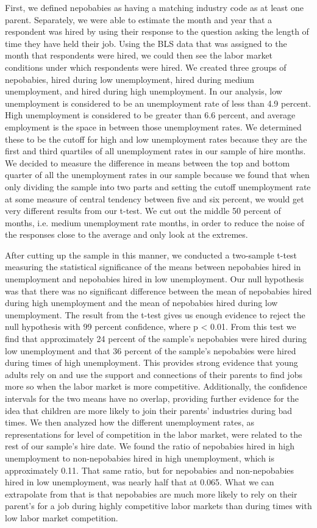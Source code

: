 \documentclass[12pt]{article}
\begin{document}
First, we defined nepobabies as having a matching industry code as at least one parent. Separately, we were able to estimate the month and year that a respondent was hired by using their response to the question asking the length of time they have held their job. Using the BLS data that was assigned to the month that respondents were hired, we could then see the labor market conditions under which respondents were hired. We created three groups of nepobabies, hired during low unemployment, hired during medium unemployment, and hired during high unemployment. In our analysis, low unemployment is considered to be an unemployment rate of less than 4.9 percent. High unemployment is considered to be greater than 6.6 percent, and average employment is the space in between those unemployment rates. We determined these to be the cutoff for high and low unemployment rates because they are the first and third quartiles of all unemployment rates in our sample of hire months. We decided to measure the difference in means between the top and bottom quarter of all the unemployment rates in our sample because we found that when only dividing the sample into two parts and setting the cutoff unemployment rate at some measure of central tendency between five and six percent, we would get very different results from our t-test. We cut out the middle 50 percent of months, i.e. medium unemployment rate months, in order to reduce the noise of the responses close to the average and only look at the extremes.


After cutting up the sample in this manner, we conducted a two-sample t-test measuring the statistical significance of the means between nepobabies hired in unemployment and nepobabies hired in low unemployment. Our null hypothesis was that there was no significant difference between the mean of nepobabies hired during high unemployment and the mean of nepobabies hired during low unemployment. The result from the t-test gives us enough evidence to reject the null hypothesis with 99 percent confidence, where p <  0.01. From this test we find that approximately 24 percent of the sample’s nepobabies were hired during low unemployment and that 36 percent of the sample’s nepobabies were hired during times of high unemployment. This provides strong evidence that young adults rely on and use the support and connections of their parents to find jobs more so when the labor market is more competitive. Additionally, the confidence intervals for the two means have no overlap, providing further evidence for the idea that children are more likely to join their parents’ industries during bad times. We then analyzed how the different unemployment rates, as representations for level of competition in the labor market, were related to the rest of our sample’s hire date. We found the ratio of nepobabies hired in high unemployment to non-nepobabies hired in high unemployment, which is approximately 0.11. That same ratio, but for nepobabies and non-nepobabies hired in low unemployment, was nearly half that at 0.065. What we can extrapolate from that is that nepobabies are much more likely to rely on their parent’s for a job during highly competitive labor markets than during times with low labor market competition.
\end{document}

